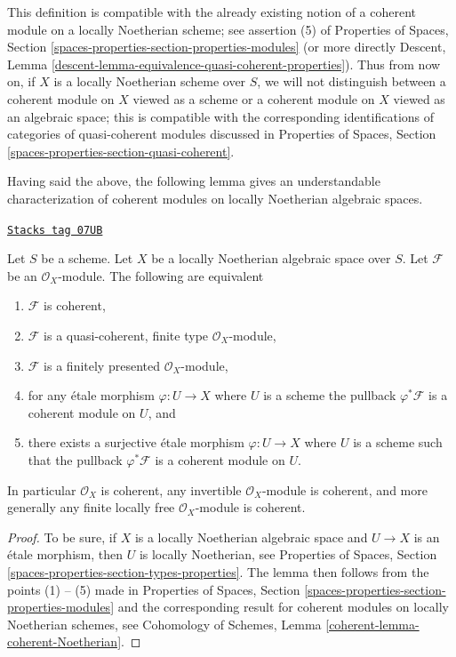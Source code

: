This definition is compatible with the already existing notion of a
coherent module on a locally Noetherian scheme; see assertion (5) of
Properties of Spaces, Section
\ref{spaces-properties-section-properties-modules} (or more directly
Descent, Lemma \ref{descent-lemma-equivalence-quasi-coherent-properties}).
Thus from now on, if $X$ is a locally Noetherian scheme over $S$,
we will not distinguish between a coherent module on $X$ viewed
as a scheme or a coherent module on $X$ viewed as an algebraic space;
this is compatible with the corresponding identifications of categories
of quasi-coherent modules discussed in
Properties of Spaces, Section \ref{spaces-properties-section-quasi-coherent}.

\medskip\noindent
Having said the above, the following lemma gives an understandable
characterization of coherent modules on locally Noetherian algebraic
spaces.

\begin{lemma}
\label{spaces-cohomology-lemma-coherent-Noetherian}
\href{https://stacks.math.columbia.edu/tag/07UB}{\texttt{Stacks tag 07UB}}

Let $S$ be a scheme.
Let $X$ be a locally Noetherian algebraic space over $S$.
Let $\mathcal{F}$ be an $\mathcal{O}_X$-module.
The following are equivalent
\begin{enumerate}
\item $\mathcal{F}$ is coherent,
\item $\mathcal{F}$ is a quasi-coherent, finite type $\mathcal{O}_X$-module,
\item $\mathcal{F}$ is a finitely presented $\mathcal{O}_X$-module,
\item for any \'etale morphism $\varphi : U \to X$ where $U$ is a scheme
the pullback $\varphi^*\mathcal{F}$ is a coherent module on $U$, and
\item there exists a surjective \'etale morphism $\varphi : U \to X$
where $U$ is a scheme such that the pullback $\varphi^*\mathcal{F}$ is
a coherent module on $U$.
\end{enumerate}
In particular $\mathcal{O}_X$ is coherent, any invertible
$\mathcal{O}_X$-module is coherent, and more generally any
finite locally free $\mathcal{O}_X$-module is coherent.
\end{lemma}

\begin{proof}
To be sure, if $X$ is a locally Noetherian algebraic space and
$U \to X$ is an \'etale morphism, then $U$ is locally Noetherian, see
Properties of Spaces, Section \ref{spaces-properties-section-types-properties}.
The lemma then follows from the points (1) -- (5) made in
Properties of Spaces, Section \ref{spaces-properties-section-properties-modules}
and the corresponding result for coherent modules on locally
Noetherian schemes, see
Cohomology of Schemes, Lemma \ref{coherent-lemma-coherent-Noetherian}.
\end{proof}

